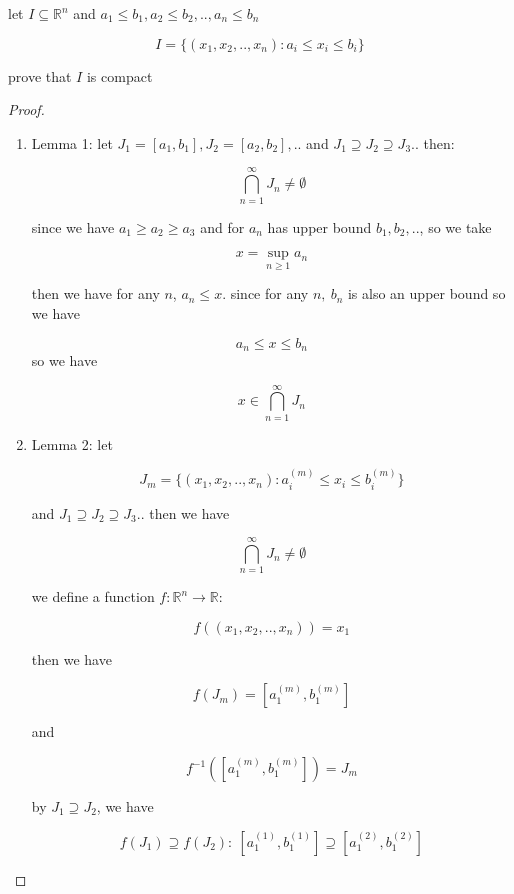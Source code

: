 \begin{exercise}
    let $I \subseteq \mathbb{R}^n$ and $a_1 \le b_1, a_2 \le b_2, .., a_n \le b_n$

    \[
        I = \{ (x_1,x_2, .. ,x_n) : a_i \le x_i \le b_i \}
    \]

    prove that $I$ is compact
\end{exercise}

\begin{proof}
    \begin{enumerate}
        \item Lemma 1: let $J_1 = [a_1, b_1], J_2 = [a_2, b_2], ..$ and $J_1 \supseteq J_2 \supseteq J_3 .. $ then:

        \[
            \bigcap_{n=1}^{\infty}J_n \ne \emptyset
        \]

        since we have $a_1 \ge a_2 \ge a_3$ and for $a_n$ has upper bound $b_1,b_2, .. $, so we take

        \[
            x = \sup_{n \ge 1}a_n
        \]

        then we have for any $n$, $a_n \le x$. since for any $n,\: b_n$ is also an upper bound so we have

        \[
            a_n \le x \le b_n
        \]
        so we have

        \[
            x \in \bigcap_{n=1}^{\infty}J_n
        \]

        \item Lemma 2: let 

        \[
            J_m = \{ (x_1,x_2, .. ,x_n) : a_i^{(m)} \le x_i \le b_i^{(m)} \}
        \]

        and $J_1 \supseteq J_2 \supseteq J_3 .. $ then we have

        \[
            \bigcap_{n=1}^{\infty}J_n \ne \emptyset
        \]

        we define a function $f: \mathbb{R}^n \to \mathbb{R}$:

        \[
            f((x_1, x_2, .. ,x_n)) = x_1
        \]

        then we have

        \[
            f(J_m) = [a_1^{(m)}, b_1^{(m)}] 
        \]

        and

        \[
            f^{-1}([a_1^{(m)}, b_1^{(m)}]) = J_m
        \]

        by $J_1 \supseteq J_2$, we have

        \[
            f(J_1) \supseteq f(J_2):\: [a_1^{(1)}, b_1^{(1)}] \supseteq [a_1^{(2)}, b_1^{(2)}]
        \]


\end{enumerate}
\end{proof}
